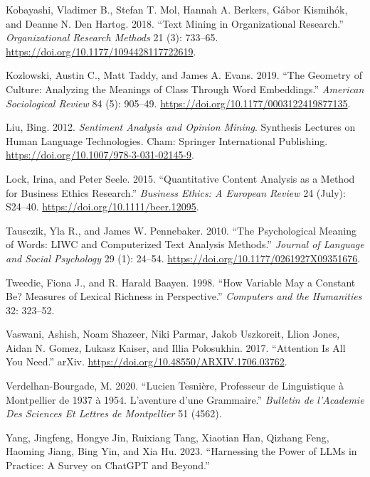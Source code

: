 \documentclass[
  letterpaper,
  DIV=11,
  numbers=noendperiod]{scrreprt}
\newlength{\cslhangindent}
\newenvironment{CSLReferences}[2] %
 {\begin{list}{}{%
  \setlength{\itemindent}{0pt}
  \setlength{\leftmargin}{0pt}
  \setlength{\parsep}{0pt}
  \ifodd #1
   \setlength{\leftmargin}{\cslhangindent}
   \setlength{\itemindent}{-1\cslhangindent}
  \fi
  \setlength{\itemsep}{#2\baselineskip}}}
 {\end{list}}
\begin{document}
\begin{CSLReferences}{1}{0}
Kobayashi, Vladimer B., Stefan T. Mol, Hannah A. Berkers, Gábor
Kismihók, and Deanne N. Den Hartog. 2018. {``Text Mining in
Organizational Research.''} \emph{Organizational Research Methods} 21
(3): 733--65. \url{https://doi.org/10.1177/1094428117722619}.

Kozlowski, Austin C., Matt Taddy, and James A. Evans. 2019. {``The
Geometry of Culture: Analyzing the Meanings of Class Through Word
Embeddings.''} \emph{American Sociological Review} 84 (5): 905--49.
\url{https://doi.org/10.1177/0003122419877135}.

Liu, Bing. 2012. \emph{Sentiment Analysis and Opinion Mining}. Synthesis
Lectures on Human Language Technologies. Cham: Springer International
Publishing. \url{https://doi.org/10.1007/978-3-031-02145-9}.

Lock, Irina, and Peter Seele. 2015. {``Quantitative Content Analysis as
a Method for Business Ethics Research.''} \emph{Business Ethics: A
European Review} 24 (July): S24--40.
\url{https://doi.org/10.1111/beer.12095}.

Tausczik, Yla R., and James W. Pennebaker. 2010. {``The Psychological
Meaning of Words: {LIWC} and Computerized Text Analysis Methods.''}
\emph{Journal of Language and Social Psychology} 29 (1): 24--54.
\url{https://doi.org/10.1177/0261927X09351676}.

Tweedie, Fiona J., and R. Harald Baayen. 1998. {``How Variable May a
Constant Be? Measures of Lexical Richness in Perspective.''}
\emph{Computers and the Humanities} 32: 323--52.

Vaswani, Ashish, Noam Shazeer, Niki Parmar, Jakob Uszkoreit, Llion
Jones, Aidan N. Gomez, Lukasz Kaiser, and Illia Polosukhin. 2017.
{``Attention Is All You Need.''} {arXiv}.
\url{https://doi.org/10.48550/ARXIV.1706.03762}.

Verdelhan-Bourgade, M. 2020. {``Lucien Tesnière, Professeur de
Linguistique à Montpellier de 1937 à 1954. L'aventure d'une
Grammaire.''} \emph{Bulletin de l'Academie Des Sciences Et Lettres de
Montpellier} 51 (4562).

Yang, Jingfeng, Hongye Jin, Ruixiang Tang, Xiaotian Han, Qizhang Feng,
Haoming Jiang, Bing Yin, and Xia Hu. 2023. {``Harnessing the Power of
{LLMs} in Practice: A Survey on {ChatGPT} and Beyond.''}

\end{CSLReferences}
\end{document}

